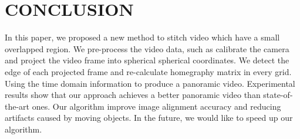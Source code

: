 \documentclass[conference]{IEEEtran}
\begin{document}
\section{CONCLUSION}
\label{sec:conclusion}

In this paper, we proposed a new method to stitch video which have a small overlapped region. We pre-process the video data, such as calibrate the camera and project the video frame into spherical
spherical coordinates. We detect the edge of each projected frame and re-calculate homegraphy matrix in every grid. Using the time domain information to produce a panoramic video. 
Experimental results show that our approach achieves a better panoramic video than state-of-the-art ones. Our algorithm improve image alignment accuracy and reducing artifacts caused by
moving objects. In the future, we would like to speed up our algorithm.
\end{document}
